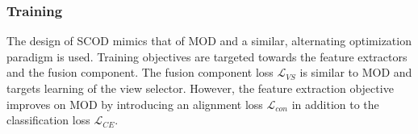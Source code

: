 \subsubsection{Training}
The design of SCOD mimics that of MOD and a similar, alternating optimization paradigm is used. Training objectives are targeted towards the feature extractors and the fusion component. The fusion component loss $\mathcal{L}_{VS}$ is similar to MOD and targets learning of the view selector. However, the feature extraction objective improves on MOD by introducing an alignment loss $\mathcal{L}_{con}$ in addition to the classification loss $\mathcal{L}_{CE}$.


